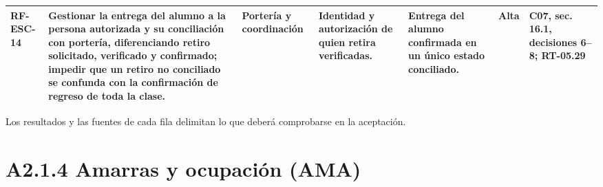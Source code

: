 \begin{longtable}{|L{0.080645\AnchoTablaAnexo}|L{0.262097\AnchoTablaAnexo}|L{0.100806\AnchoTablaAnexo}|L{0.145161\AnchoTablaAnexo}|L{0.173387\AnchoTablaAnexo}|L{0.060484\AnchoTablaAnexo}|L{0.177420\AnchoTablaAnexo}|}
RF-\allowbreak{}ESC-\allowbreak{}14 &
Gestionar la entrega del alumno a la persona autorizada y su conciliación con portería, diferenciando retiro solicitado, verificado y confirmado; impedir que un retiro no conciliado se confunda con la confirmación de regreso de toda la clase. &
Portería y coordinación &
Identidad y autorización de quien retira verificadas. &
Entrega del alumno confirmada en un único estado conciliado. &
Alta &
C07, sec. 16.1, decisiones 6–8; RT-05.29 \\ \hline

\end{longtable}

Los resultados y las fuentes de cada fila delimitan lo que deberá comprobarse en la aceptación.

\clearpage\section*{A2.1.4 Amarras y ocupación (AMA)}


